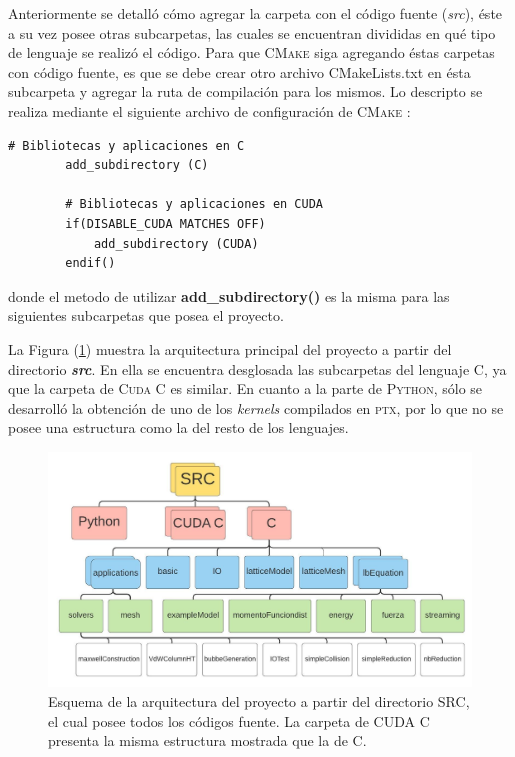 Anteriormente se detalló cómo agregar la carpeta con el código fuente (\textit{src}), éste a su vez posee otras subcarpetas, las cuales se encuentran divididas en qué tipo de lenguaje se realizó el código. Para que \textsc{CMake} siga agregando éstas carpetas con código fuente, es que se debe crear otro archivo CMakeLists.txt en ésta subcarpeta y agregar la ruta de compilación para los mismos. Lo descripto se realiza mediante el siguiente archivo de configuración de \textsc{CMake} :

{\footnotesize
	\begin{frame}{}
		\begin{lstlisting}[frame=single]
		# Bibliotecas y aplicaciones en C
		add_subdirectory (C)

		# Bibliotecas y aplicaciones en CUDA
		if(DISABLE_CUDA MATCHES OFF)
			add_subdirectory (CUDA)
		endif()
		\end{lstlisting}
		
	\end{frame}
}


donde el metodo de utilizar \textbf{add\_subdirectory()} es la misma para las siguientes subcarpetas que posea el proyecto. 

La Figura (\ref{fig:arq_proyecto}) muestra la arquitectura principal del proyecto a partir del directorio \textit{\textbf{src}}. En ella se encuentra desglosada las subcarpetas del lenguaje \textsc{C}, ya que la carpeta de \textsc{Cuda C} es similar. En cuanto a la parte de \textsc{Python}, sólo se desarrolló la obtención de uno de los \textit{kernels} compilados en \textsc{ptx}, por lo que no se posee una estructura como la del resto de los lenguajes.

\begin{figure}[htbp]
	\centering
	\includegraphics[width=\textwidth]{figs/cap3/arquitectura_del_proyecto_LBCUDA_Test}
	\caption{Esquema de la arquitectura del proyecto a partir del directorio SRC, el cual posee todos los códigos fuente. La carpeta de CUDA C presenta la misma estructura mostrada que la de C.}
	\label{fig:arq_proyecto}	
\end{figure}

